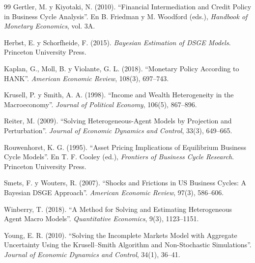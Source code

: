 \begin{thebibliography}{99}
 Gertler, M. y Kiyotaki, N. (2010).
``Financial Intermediation and Credit Policy in Business Cycle Analysis''.
En B. Friedman y M. Woodford (eds.), \emph{Handbook of Monetary Economics}, vol. 3A.

 Herbst, E. y Schorfheide, F. (2015).
\emph{Bayesian Estimation of DSGE Models}. Princeton University Press.

 Kaplan, G., Moll, B. y Violante, G. L. (2018).
``Monetary Policy According to HANK''. \emph{American Economic Review}, 108(3), 697--743.

 Krusell, P. y Smith, A. A. (1998).
``Income and Wealth Heterogeneity in the Macroeconomy''.
\emph{Journal of Political Economy}, 106(5), 867--896.

 Reiter, M. (2009).
``Solving Heterogeneous-Agent Models by Projection and Perturbation''.
\emph{Journal of Economic Dynamics and Control}, 33(3), 649--665.

 Rouwenhorst, K. G. (1995).
``Asset Pricing Implications of Equilibrium Business Cycle Models''.
En T. F. Cooley (ed.), \emph{Frontiers of Business Cycle Research}. Princeton University Press.

 Smets, F. y Wouters, R. (2007).
``Shocks and Frictions in US Business Cycles: A Bayesian DSGE Approach''.
\emph{American Economic Review}, 97(3), 586--606.

 Winberry, T. (2018).
``A Method for Solving and Estimating Heterogeneous Agent Macro Models''.
\emph{Quantitative Economics}, 9(3), 1123--1151.

 Young, E. R. (2010).
``Solving the Incomplete Markets Model with Aggregate Uncertainty Using the
Krusell--Smith Algorithm and Non-Stochastic Simulations''.
\emph{Journal of Economic Dynamics and Control}, 34(1), 36--41.

\end{thebibliography}

